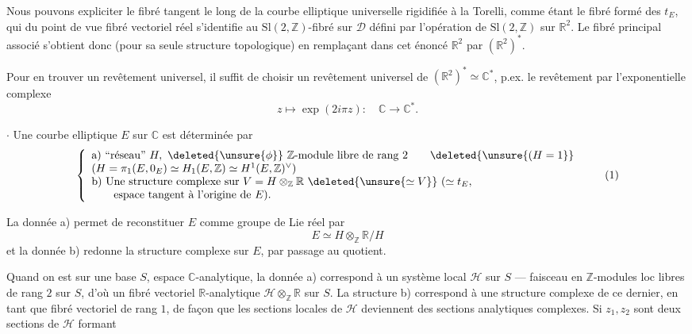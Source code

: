 

Nous pouvons expliciter le fibré tangent le long   de la courbe elliptique universelle rigidifiée à la Torelli, comme étant le fibré formé des $t_E$, qui du point de vue fibré vectoriel réel s'identifie au  $\mathrm{Sl}(2,\mathbb Z)$-fibré sur $\mathcal D$ défini par l'opération  de $\mathrm{Sl}(2,\mathbb Z)$ sur $\mathbb R^2$. Le fibré principal associé  s'obtient donc (pour sa seule structure topologique) en remplaçant dans cet énoncé $\mathbb R^2$ par $(\mathbb R^2)^*$.

Pour en trouver un revêtement universel, il suffit de choisir un revêtement universel de $(\mathbb R^2)^*\simeq\mathbb C^*$, p.ex. le revêtement par l'exponentielle complexe
\[
z\longmapsto\exp(2i\pi z):\quad
\mathbb C\longrightarrow\mathbb C^*.
\]

$\cdot$ Une courbe elliptique $E$ sur $\mathbb C$ est déterminée par
\begin{equation}
\left\{
\begin{array}{l}
\text{a) ``réseau'' }H,\ \deleted{\unsure{\phi}}\ \mathbb Z\text{-module libre de rang }2
\qquad\deleted{\unsure{(H=1}}\\
(H=\pi_1(E,0_E)\simeq H_1(E,\mathbb Z)\simeq H^1(E,\mathbb Z)^\vee)\\
\text{b) Une structure complexe sur }V=H\otimes_{\mathbb Z}\mathbb R\ \deleted{\unsure{\simeq V}}\
(\simeq t_E,\\
\qquad\text{espace tangent à l'origine de }E).
\end{array}
\right.
\tag{1}
\end{equation}

La donnée a) permet de reconstituer $E$ comme groupe de Lie réel par
\begin{equation}
E\simeq H\otimes_{\mathbb Z}\mathbb R/H
\tag{2}
\end{equation}
et la donnée b) redonne la structure complexe sur $E$, par passage au quotient.

Quand on est sur une base $S$, espace $\mathbb C$-analytique, la donnée a) correspond à un système local $\mathcal H$ sur $S$ --- faisceau en $\mathbb Z$-modules loc libres de rang $2$ sur $S$, d'où un fibré vectoriel $\mathbb R$-analytique $\mathcal H\otimes_{\mathbb Z}\mathbb R$ sur $S$. La structure b) correspond à une structure complexe  de ce dernier, en tant que fibré vectoriel  de rang $1$, de façon que les sections locales de $\mathcal H$ deviennent des sections analytiques complexes. Si  $z_1,z_2$ sont deux sections de $\mathcal H$ formant

